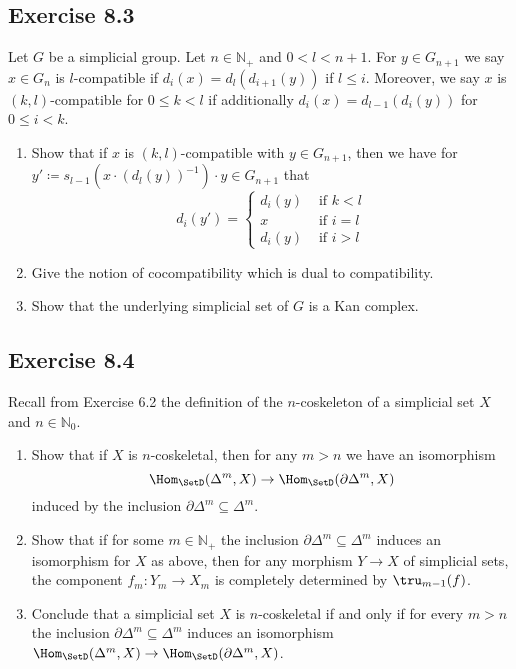 \subsection{ Exercise 8.3 }

Let $ G $ be a simplicial group.
Let $ n \in \mathbb{ N }_+ $ and $ 0 < l < n+1 $. 
For $ y \in G_{n+1} $ we say $ x \in G_n $ is $l$-compatible if $ d_i ( x ) = d_l ( d_{i+1} ( y ) ) $ if $ l \leq i $. 
Moreover, we say $x$ is $ ( k , l ) $-compatible for $ 0 \leq k < l $ if additionally $ d_i ( x ) = d_{ l-1 } ( d_i ( y ) ) $ for $ 0 \leq i < k $.

\begin{enumerate}[label=(\alph*)]
    \item 
    Show that if $ x $ is $ ( k , l ) $-compatible with $ y \in G_{n+1} $, then we have for $ y' \coloneqq s_{l-1} ( x \cdot ( d_l ( y ))^{-1} ) \cdot y  \in G_{n+1} $ that 
    \[
    d_i ( y' ) =
    \begin{cases} 
        d_i(y) &\text{ if } k < l
        \\
        x &\text{ if } i = l 
        \\
        d_i ( y ) &\text{ if } i > l
    \end{cases}
    \]

    \item 
    Give the notion of cocompatibility which is dual to compatibility.

    \item 
    Show that the underlying simplicial set of $ G $ is a Kan complex.
    
\end{enumerate}

\subsection{Exercise 8.4}

Recall from Exercise 6.2 the definition of the $n$-coskeleton of a simplicial set $ X $ and $ n \in \mathbb{N}_0 $.

\begin{enumerate}[label=(\alph*)]
    \item 
    Show that if $ X $ is $n$-coskeletal, then for any $ m > n $ we have an isomorphism
    \[
        \Hom_{\SetD}( \Delta^m , X ) 
        \to 
        \Hom_{\SetD} ( \partial \Delta^m , X ) 
    \]
    induced by the inclusion $ \partial \Delta^m \subseteq \Delta^m$.

    \item 
    Show that if for some $ m \in \mathbb{N}_+$ the inclusion $ \partial \Delta^m \subseteq \Delta^m $ induces an isomorphism for $ X $ as above, then for any morphism $ Y \to X $ of simplicial sets, the component $ f_m \colon Y_m \to X_m $ is completely determined by $ \tru_{m-1} ( f ) $.

    \item 
    Conclude that a simplicial set $ X $ is $ n $-coskeletal if and only if for every $ m > n $ the inclusion $ \partial \Delta^m \subseteq \Delta^m $ induces an isomorphism $ \Hom_{ \SetD } ( \Delta^m , X ) \to \Hom_{\SetD} ( \partial \Delta^m , X )$.
    
\end{enumerate}

